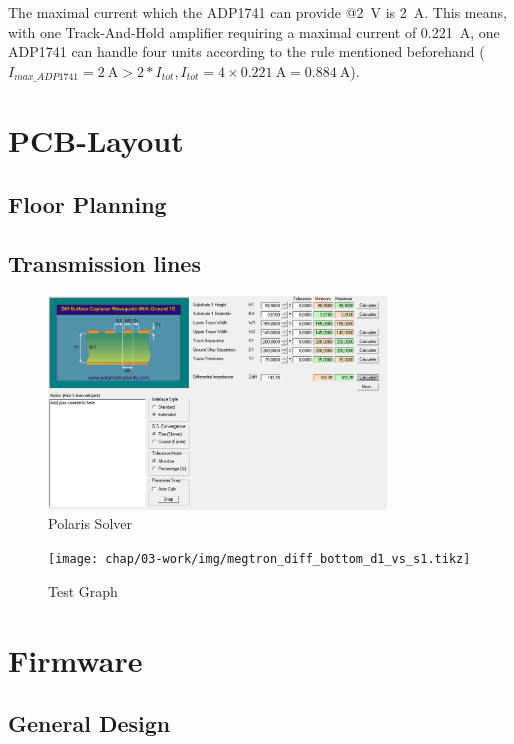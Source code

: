 The maximal current which the ADP1741 can provide @\SI{2}{\volt} is \SI{2}{\ampere}. This means, with one Track-And-Hold amplifier requiring a maximal current of \SI{0.221}{\ampere}, one ADP1741 can handle four units according to the rule mentioned beforehand ($I_{max\_ADP1741} = \SI{2}{\ampere} > 2 * I_{tot}, I_{tot} = 4 \times \SI{0.221}{\ampere} =  \SI{0.884}{\ampere}$).



\newpage
\section{PCB-Layout}
\subsection{Floor Planning}
\subsection{Transmission lines}

\begin{figure}[H]
	\centering
	\includegraphics[width = 0.8\textwidth]{chap/03-work/img/polaris}
	\caption{Polaris Solver}
	\label{fig:polaris}
\end{figure}

\begin{figure}[H]
	\centering
	\texttt{[image: chap/03-work/img/megtron\_diff\_bottom\_d1\_vs\_s1.tikz]}
	\caption{Test Graph}
	\label{fig:megtron}
\end{figure}

  
\newpage
\section{Firmware}
\subsection{General Design}

